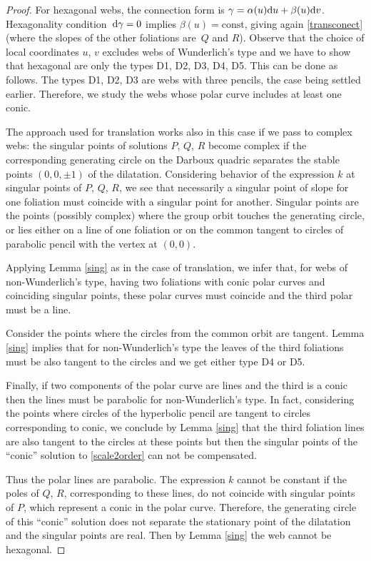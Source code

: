\documentclass[pdftex]{sigma}
\numberwithin{equation}{section}
\begin{document}
\begin{proof}
 For hexagonal webs, the connection form is
$\gamma=\alpha(u){\rm d}u+\beta(u){\rm d}v$. Hexagonality condition~${{\rm d}\gamma=0}$ implies $\beta(u)=\text{const}$, giving again \eqref{transconect} (where the slopes of the other foliations are~$Q$ and $R$).
Observe that the choice of local coordinates $u$, $v$ excludes webs of Wunderlich's type and we have to show that hexagonal are only the types D1, D2, D3, D4, D5.
This can be done as follows. The types D1, D2, D3 are webs with three pencils, the case being settled earlier. Therefore, we study the webs whose polar curve includes at least one conic.

The approach used for translation works also in this case if we pass to complex webs: the singular points of solutions $P$, $Q$, $R$ become complex if the corresponding generating circle on the Darboux quadric separates the stable points $(0,0,\pm 1)$ of the dilatation.
Considering behavior of the expression $k$ at singular points of $P$, $Q$, $R$, we see that necessarily a singular point of slope for one foliation must coincide with a singular point for another. Singular points are the points (possibly complex) where the group orbit touches the generating circle, or lies either on a line of one foliation or on the common tangent to circles of parabolic pencil with the vertex at $(0,0)$.

Applying Lemma \ref{sing} as in the case of translation, we infer that, for webs of non-Wunderlich's type, having two foliations with conic polar curves and coinciding singular points, these polar curves must coincide and the third polar must be a line.

Consider the points where the circles from the common orbit are tangent. Lemma \ref{sing} implies that for non-Wunderlich's type the leaves of the third foliations must be also tangent to the circles and we get either type D4 or D5.

Finally, if two components of the polar curve are lines and the third is a conic then the lines must be parabolic for
non-Wunderlich's type. In fact, considering the points where circles of the hyperbolic pencil are tangent to circles corresponding to conic, we conclude by Lemma \ref{sing} that the third foliation lines are also tangent to the circles at these points but then the singular points of the ``conic'' solution to \eqref{scale2order} can not be compensated.

Thus the polar lines are parabolic. The expression $k$ cannot be constant if the poles of $Q$, $R$, corresponding to these lines, do not coincide with singular points of $P$, which represent a conic in the polar curve. Therefore, the generating circle of this ``conic'' solution does not separate the stationary point of the dilatation and the singular points are real. Then by Lemma \ref{sing} the web cannot be hexagonal.


\end{proof}
\end{document}
